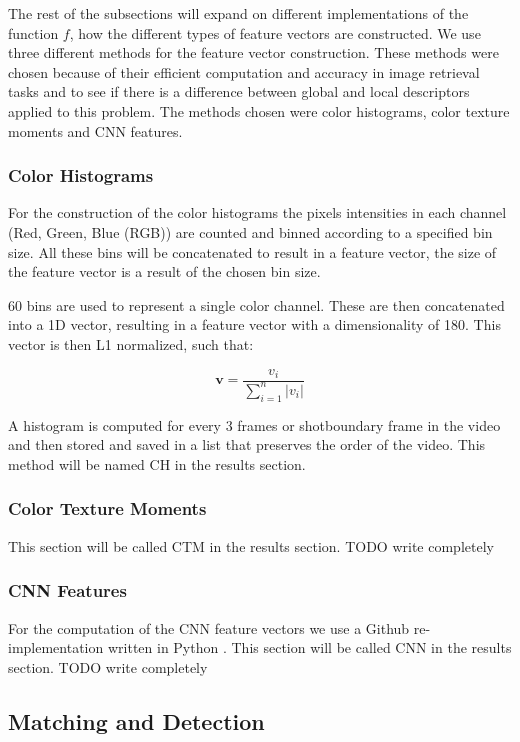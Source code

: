 \documentclass{article}
\begin{document}
The rest of the subsections will expand on different implementations of the function $f$, how the different types of feature vectors are constructed. We use three different methods for the feature vector construction. These methods were chosen because of their efficient computation and accuracy in image retrieval tasks and to see if there is a difference between global and local descriptors applied to this problem. The methods chosen were color histograms, color texture moments and CNN features.

\subsubsection{Color Histograms}
For the construction of the color histograms the pixels intensities in each channel (Red, Green, Blue (RGB)) are counted and binned according to a specified bin size. All these bins will be concatenated to result in a feature vector, the size of the feature vector is a result of the chosen bin size.

60 bins are used to represent a single color channel. These are then concatenated into a 1D vector, resulting in a feature vector with a dimensionality of 180. This vector is then L1 normalized, such that:

\[\textbf{v} = \frac{v_i}{\sum_{i=1}^{n}|v_i|}\]

A histogram is computed for every 3 frames or shotboundary frame in the video and then stored and saved in a list that preserves the order of the video. This method will be named CH in the results section.

\subsubsection{Color Texture Moments}
This section will be called CTM in the results section. TODO write completely


\subsubsection{CNN Features}
For the computation of the CNN feature vectors we use a Github re-implementation written in Python \cite{rmac-github}. This section will be called CNN in the results section. TODO write completely


\subsection{Matching and Detection}
\end{document}
